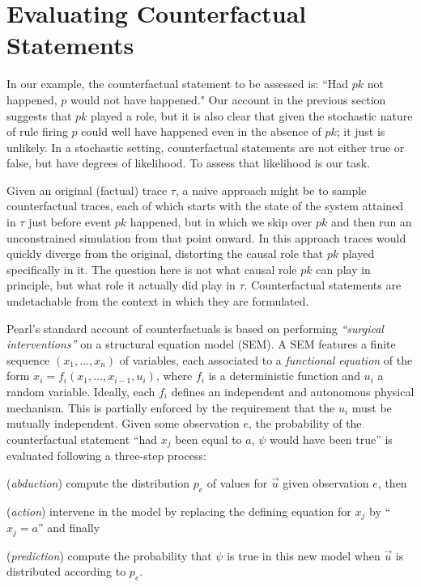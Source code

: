 
\newcommand{\PCFST}[0]{\ProbParen{\CFST{}}}

\newcommand{\ItAbduction}[0]{(\textit{abduction})}
\newcommand{\ItAction}[0]{(\textit{action})}
\newcommand{\ItPrediction}[0]{(\textit{prediction})}


\section{Evaluating Counterfactual
  Statements}\label{sec:counterfactual}

In our example, the counterfactual statement to be assessed is: ``Had
$pk$ not happened, $p$ would not have happened."  Our account in the
previous section suggests that $pk$ played a role, but it is also
clear that given the stochastic nature of rule firing $p$ could well
have happened even in the absence of $pk$; it just is unlikely. In a
stochastic setting, counterfactual statements are not either true or
false, but have degrees of likelihood. To assess that likelihood is
our task.

Given an original (factual) trace $\tau$, a naive approach might be to
sample counterfactual traces, each of which starts with the state of
the system attained in $\tau$ just before event $pk$ happened, but in
which we skip over $pk$ and then run an unconstrained simulation from
that point onward. In this approach traces would quickly diverge from
the original, distorting the causal role that $pk$ played specifically
in it. The question here is not what causal role $pk$ can play in
principle, but what role it actually did play in $\tau$.
Counterfactual statements are undetachable from the context in which
they are formulated.

Pearl's standard account of counterfactuals \cite{pearl2009causality}
is based on performing \textit{``surgical interventions''} on a
structural equation model (SEM). A SEM features a finite sequence
$(x_1, \dots, x_n)$ of variables, each associated to a
\emph{functional equation} of the form
$x_i = f_i(x_1, \dots, x_{i-1}, u_i)$, where $f_i$ is a deterministic
function and $u_i$ a random variable. Ideally, each $f_i$ defines an
independent and autonomous physical mechanism. This is partially
enforced by the requirement that the $u_i$ must be mutually
independent. Given some observation $e$, the probability of the
counterfactual statement ``had $x_j$ been equal to $a$, $\psi$ would
have been true'' is evaluated following a three-step process:
\begin{inparaenum}[]
\item \ItAbduction{} compute the distribution $p_e$ of values for
  $\vec u$ given observation $e$, then
\item \ItAction{} intervene in the model by replacing the defining
  equation for $x_j$ by ``$x_j = a$'' and finally
\item \ItPrediction{} compute the probability that $\psi$ is true in
  this new model when $\vec{u}$ is distributed according to $p_e$.
\end{inparaenum}

